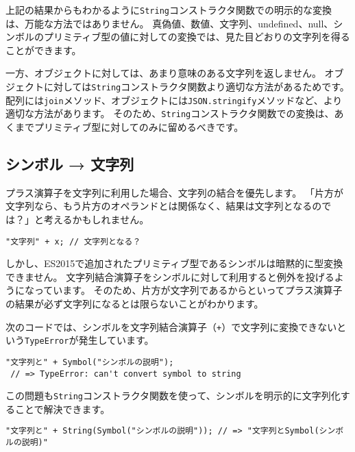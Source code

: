 上記の結果からもわかるように\texttt{String}コンストラクタ関数での明示的な変換は、万能な方法ではありません。
真偽値、数値、文字列、undefined、null、シンボルのプリミティブ型の値に対しての変換では、見た目どおりの文字列を得ることができます。

一方、オブジェクトに対しては、あまり意味のある文字列を返しません。
オブジェクトに対しては\texttt{String}コンストラクタ関数より適切な方法があるためです。
配列には\texttt{join}メソッド、オブジェクトには\texttt{JSON.stringify}メソッドなど、より適切な方法があります。
そのため、\texttt{String}コンストラクタ関数での変換は、あくまでプリミティブ型に対してのみに留めるべきです。

\hypertarget{symbol-to-string}{%
\subsection{シンボル → 文字列}\label{symbol-to-string}}

プラス演算子を文字列に利用した場合、文字列の結合を優先します。
「片方が文字列なら、もう片方のオペランドとは関係なく、結果は文字列となるのでは？」と考えるかもしれません。

\begin{lstlisting}
"文字列" + x; // 文字列となる？
\end{lstlisting}

しかし、ES2015で追加されたプリミティブ型であるシンボルは暗黙的に型変換できません。
文字列結合演算子をシンボルに対して利用すると例外を投げるようになっています。
そのため、片方が文字列であるからといってプラス演算子の結果が必ず文字列になるとは限らないことがわかります。

次のコードでは、シンボルを文字列結合演算子（\texttt{+}）で文字列に変換できないという\texttt{TypeError}が発生しています。

\begin{lstlisting}
"文字列と" + Symbol("シンボルの説明");
 // => TypeError: can't convert symbol to string
\end{lstlisting}

\enlargethispage{\baselineskip}この問題も\texttt{String}コンストラクタ関数を使って、シンボルを明示的に文字列化することで解決できます。

\begin{lstlisting}
"文字列と" + String(Symbol("シンボルの説明")); // => "文字列とSymbol(シンボルの説明)"
\end{lstlisting}


